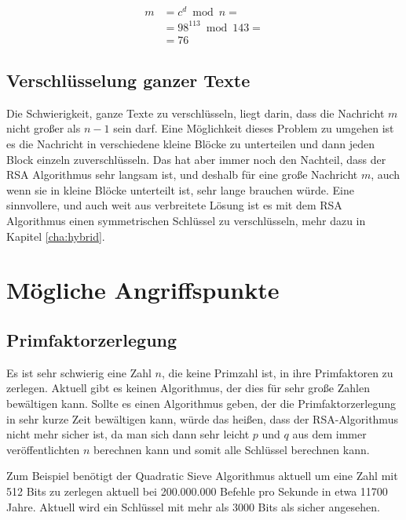 \documentclass[12pt,a4paper]{scrartcl}
\begin{document}
	\begin{equation}
	\begin{split}
	m & = c^d \bmod n = \\
	 &  = 98^{113} \bmod 143 = \\
 	& = 76
	\end{split}
	\end{equation}


	\subsection{Verschlüsselung ganzer Texte}
		\label{cha:hole_text}

	Die Schwierigkeit, ganze Texte zu verschlüsseln, liegt darin, dass die Nachricht $m$ nicht großer als $n - 1$ sein darf. Eine Möglichkeit dieses Problem zu umgehen ist es die Nachricht in verschiedene kleine Blöcke zu unterteilen und dann jeden Block einzeln zuverschlüsseln. Das hat aber immer noch den Nachteil, dass der RSA Algorithmus sehr langsam ist, und deshalb für eine große Nachricht $m$, auch wenn sie in kleine Blöcke unterteilt ist, sehr lange brauchen würde. Eine sinnvollere, und auch weit aus verbreitete Lösung ist es mit dem RSA Algorithmus einen symmetrischen Schlüssel zu verschlüsseln, mehr dazu in Kapitel \ref{cha:hybrid}.


\section{Mögliche Angriffspunkte}
	\subsection{Primfaktorzerlegung}
	Es ist sehr schwierig eine Zahl $n$, die keine Primzahl ist, in ihre Primfaktoren zu zerlegen. Aktuell gibt es keinen Algorithmus, der dies für sehr große Zahlen bewältigen kann. Sollte es einen Algorithmus geben, der die Primfaktorzerlegung in sehr kurze Zeit bewältigen kann, würde das heißen, dass der RSA-Algorithmus nicht mehr sicher ist, da man sich dann sehr leicht $p$ und $q$ aus dem immer veröffentlichten $n$ berechnen kann und somit alle Schlüssel berechnen kann.
	
	Zum Beispiel benötigt der Quadratic Sieve Algorithmus aktuell um eine Zahl mit 512 Bits zu zerlegen aktuell bei 200.000.000 Befehle pro Sekunde in etwa 11700 Jahre. \cite[S. 115]{Beutelspacher2015-jl}
	Aktuell wird ein Schlüssel mit mehr als 3000 Bits als sicher angesehen. \cite[29]{bsireco}
	 
\end{document}
